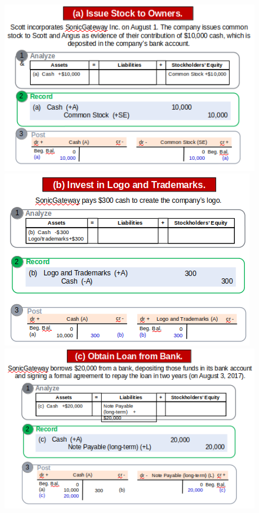 \documentclass[../main.tex]{subfiles}
\begin{document}
	\begin{figure}[ht!]
		\centering
		\includegraphics[width=1\columnwidth]{images/c2/records_eg1.png}
		\includegraphics[width=1\columnwidth]{images/c2/records_eg2.png}
		\includegraphics[width=1\columnwidth]{images/c2/records_eg3.png}

\end{figure}
\end{document}
